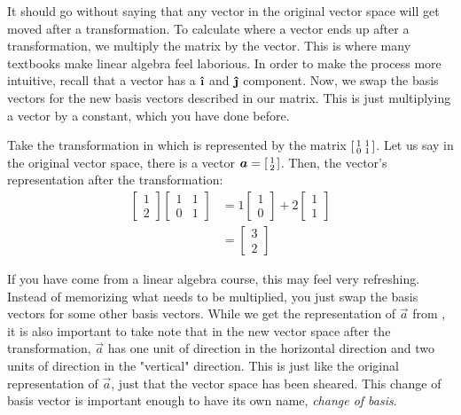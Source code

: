 It should go without saying that any vector in the original vector space will get moved after a transformation. To calculate where a vector ends up after a transformation, we multiply the matrix by the vector. This is where many textbooks make linear algebra feel laborious. In order to make the process more intuitive, recall that a vector has a \(\ihat\) and \(\jhat\) component. Now, we swap the basis vectors for the new basis vectors described in our matrix. This is just multiplying a vector by a constant, which you have done before.
\begin{example}
  Take the transformation in  which is represented by the matrix \(\begin{bsmallmatrix}
    1 & 1 \\
    0 & 1
  \end{bsmallmatrix}\). Let us say in the original vector space, there is a vector \(\vec{a}=\begin{bsmallmatrix}
    1 \\
    2
  \end{bsmallmatrix} \). Then, the vector's representation after the transformation:
  \begin{align*}
    \begin{bmatrix}
      1 \\
      2
    \end{bmatrix} \begin{bmatrix}
      1 & 1 \\
      0 & 1
    \end{bmatrix} &= 1 \begin{bmatrix}
      1 \\
      0
    \end{bmatrix} + 2 \begin{bmatrix}
      1 \\
      1
    \end{bmatrix} \\
    &= \begin{bmatrix}
      3 \\
      2
    \end{bmatrix}
  \end{align*}
\end{example}




If you have come from a linear algebra course, this may feel very refreshing. Instead of memorizing what needs to be multiplied, you just swap the basis vectors for some other basis vectors. While we get the representation of \(\vec{a}\) from , it is also important to take note that in the new vector space after the transformation, \(\vec{a}\) has one unit of direction in the horizontal direction and two units of direction in the "vertical" direction. This is just like the original representation of \(\vec{a}\), just that the vector space has been sheared. This change of basis vector is important enough to have its own name, \textit{change of basis}.


